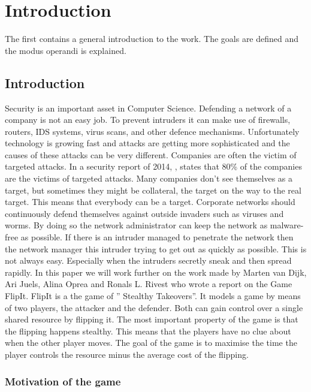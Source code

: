 \chapter{Introduction}
\label{cha:intro}
The first contains a general introduction to the work. The goals are
defined and the modus operandi is explained.
\section{Introduction}

Security is an important asset in Computer Science. Defending a network of a company is not an easy job. To prevent intruders it can make use of firewalls, routers, IDS systems, virus scans, and other defence mechanisms. Unfortunately technology is growing fast and attacks are getting more sophisticated and the causes of these attacks can be very different.  Companies are often the victim of targeted attacks. In a security report of 2014, , states that 80\% of the companies are the victims of targeted attacks. Many companies don't see themselves as a target, but sometimes they might be collateral, the target on the way to the real target. This means that everybody can be a target. 
Corporate networks should continuously defend themselves against outside invaders such as viruses and worms. By doing so the network administrator can keep the network as malware-free as possible. If there is  an intruder managed to penetrate the network then the network manager this intruder trying to get out as quickly as possible. This is not always easy. Especially when the intruders secretly sneak and then spread rapidly.
In this paper we will work further on the work made by Marten van Dijk, Ari Juels, Alina Oprea and Ronals L. Rivest  who wrote a report on the Game FlipIt. FlipIt is a the game of '' Stealthy Takeovers''. It models a game by means of two players, the attacker and the defender. Both can gain control over a single shared resource by flipping it. The most important property of the game is that the flipping happens stealthy. This means that the players have no clue about when the other player moves. The goal of the game is to maximise the time the player controls the resource minus the average cost of the flipping. 

\subsection{Motivation of the game}

